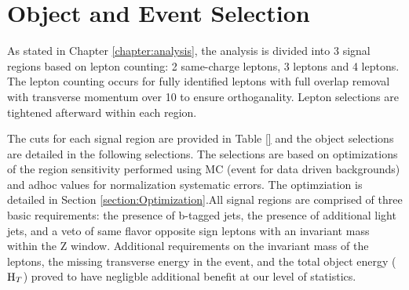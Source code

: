 \chapter[Object and Event Selection][Object and Event Selection]{Object and Event Selection}
\label{chapter:selection}

As stated in Chapter \ref{chapter:analysis}, the analysis is divided into 3 signal regions based
on lepton counting: 2 same-charge leptons, 3 leptons and 4 leptons. The lepton
counting occurs for fully identified leptons with full overlap removal with
transverse momentum over 10 \gev to ensure orthoganality. Lepton selections are tightened
afterward within each region.

The cuts for each signal region are provided in Table \ref{} and the object selections are detailed in the
following selections. The selections are based on optimizations of the region sensitivity
performed using MC (event for data driven backgrounds) and adhoc values for normalization systematic errors. The optimziation is
detailed in Section \ref{section:Optimization}.All signal regions are comprised of three basic requirements: the presence of b-tagged
jets, the presence of additional light jets, and a veto of same flavor opposite sign leptons with an
invariant mass within the Z window. Additional requirements on the invariant mass of the leptons, the missing transverse energy
in the event, and the total object energy ($\rm H_{T}$) proved to have negligble additional benefit at our level of 
statistics.


